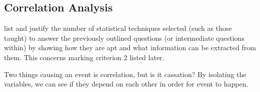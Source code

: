 \subsection{Correlation Analysis}\label{subsection}
list and justify the number of statistical techniques selected (such as those taught) to answer the previously outlined questions (or intermediate questions within) by showing how they are apt and what information can be extracted from them. This concerns marking criterion 2 listed later. 

Two things causing an event is correlation, but is it cassation? By isolating the variables, we can see if they depend on each other in order for event to happen.   